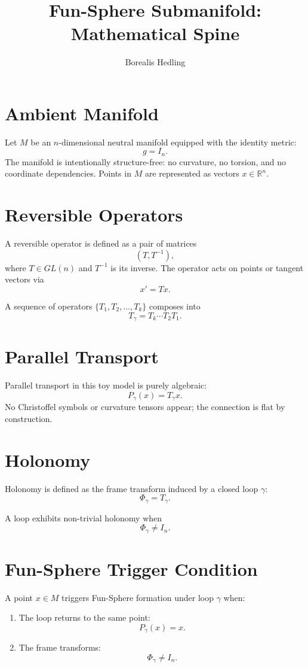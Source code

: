\documentclass[11pt]{article}
\title{Fun-Sphere Submanifold: Mathematical Spine}
\author{Borealis Hedling}
\date{}
\begin{document}
\maketitle

\section{Ambient Manifold}

Let $M$ be an $n$-dimensional neutral manifold equipped with the identity
metric:
\[
g = I_n.
\]
The manifold is intentionally structure-free:
no curvature, no torsion, and no coordinate dependencies. Points in $M$
are represented as vectors $x \in \mathbb{R}^n$.

\section{Reversible Operators}

A reversible operator is defined as a pair of matrices
\[
(T, T^{-1}),
\]
where $T \in GL(n)$ and $T^{-1}$ is its inverse. The operator acts on
points or tangent vectors via
\[
x' = T x.
\]

A sequence of operators $\{T_1, T_2, \dots, T_k\}$ composes into
\[
T_{\gamma} = T_k \cdots T_2 T_1.
\]

\section{Parallel Transport}

Parallel transport in this toy model is purely algebraic:
\[
P_{\gamma}(x) = T_{\gamma} x.
\]
No Christoffel symbols or curvature tensors appear; the connection is
flat by construction.

\section{Holonomy}

Holonomy is defined as the frame transform induced by a closed loop
$\gamma$:
\[
\Phi_{\gamma} = T_{\gamma}.
\]

A loop exhibits non-trivial holonomy when
\[
\Phi_{\gamma} \neq I_n.
\]

\section{Fun-Sphere Trigger Condition}

A point $x \in M$ triggers Fun-Sphere formation under loop $\gamma$ when:
\begin{enumerate}
    \item The loop returns to the same point:
    \[
    P_{\gamma}(x) = x.
    \]
    \item The frame transforms:
    \[
    \Phi_{\gamma} \neq I_n.
    \]
\end{enumerate}
\end{document}
